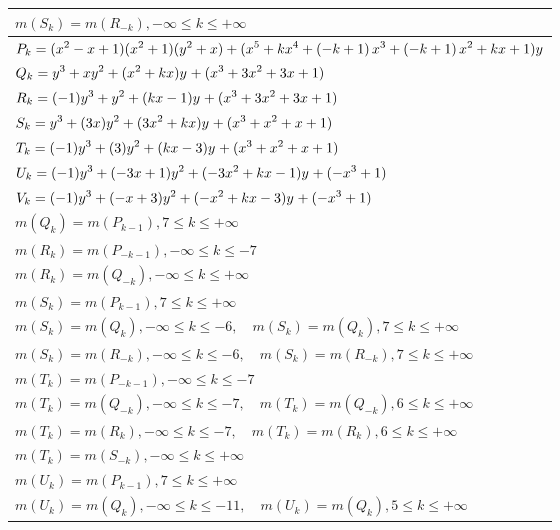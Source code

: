 \documentclass{amsart}
\begin{document}
\begin{longtable}{|l|}
\(\displaystyle m(S_k) = m(R_{-k}),-\infty \leqslant k \leqslant +\infty\)\\
\hline
\(\displaystyle P_k=(x^2
 - x
 + 1)(x^2
 + 1)(y^2+x)+(x^5
 + k\*x^4
 + \left(-k
 + 1\right) \*x^3
 + \left(-k
 + 1\right) \*x^2
 + k\*x
 + 1)y\)\\
\(\displaystyle Q_k=y^{3}+xy^{2}+(x^2
 + k\*x)y^{}+(x^3
 + 3\*x^2
 + 3\*x
 + 1)\)\\
\(\displaystyle R_k=(-1)y^{3}+y^{2}+(k\*x
 - 1)y^{}+(x^3
 + 3\*x^2
 + 3\*x
 + 1)\)\\
\(\displaystyle S_k=y^{3}+(3\*x)y^{2}+(3\*x^2
 + k\*x)y^{}+(x^3
 + x^2
 + x
 + 1)\)\\
\(\displaystyle T_k=(-1)y^{3}+(3)y^{2}+(k\*x
 - 3)y^{}+(x^3
 + x^2
 + x
 + 1)\)\\
\(\displaystyle U_k=(-1)y^{3}+(-3\*x
 + 1)y^{2}+(-3\*x^2
 + k\*x
 - 1)y^{}+(-x^3
 + 1)\)\\
\(\displaystyle V_k=(-1)y^{3}+(-x
 + 3)y^{2}+(-x^2
 + k\*x
 - 3)y^{}+(-x^3
 + 1)\)\\
\(\displaystyle m(Q_k) = m(P_{k
 - 1}),7 \leqslant k \leqslant +\infty\)\\
\(\displaystyle m(R_k) = m(P_{-k
 - 1}),-\infty \leqslant k \leqslant -7\)\\
\(\displaystyle m(R_k) = m(Q_{-k}),-\infty \leqslant k \leqslant +\infty\)\\
\(\displaystyle m(S_k) = m(P_{k
 - 1}),7 \leqslant k \leqslant +\infty\)\\
\(\displaystyle m(S_k) = m(Q_{k}),-\infty \leqslant k \leqslant -6,\quad m(S_k) = m(Q_{k}),7 \leqslant k \leqslant +\infty\)\\
\(\displaystyle m(S_k) = m(R_{-k}),-\infty \leqslant k \leqslant -6,\quad m(S_k) = m(R_{-k}),7 \leqslant k \leqslant +\infty\)\\
\(\displaystyle m(T_k) = m(P_{-k
 - 1}),-\infty \leqslant k \leqslant -7\)\\
\(\displaystyle m(T_k) = m(Q_{-k}),-\infty \leqslant k \leqslant -7,\quad m(T_k) = m(Q_{-k}),6 \leqslant k \leqslant +\infty\)\\
\(\displaystyle m(T_k) = m(R_{k}),-\infty \leqslant k \leqslant -7,\quad m(T_k) = m(R_{k}),6 \leqslant k \leqslant +\infty\)\\
\(\displaystyle m(T_k) = m(S_{-k}),-\infty \leqslant k \leqslant +\infty\)\\
\(\displaystyle m(U_k) = m(P_{k
 - 1}),7 \leqslant k \leqslant +\infty\)\\
\(\displaystyle m(U_k) = m(Q_{k}),-\infty \leqslant k \leqslant -11,\quad m(U_k) = m(Q_{k}),5 \leqslant k \leqslant +\infty\)\\

\end{longtable}
\end{document}
